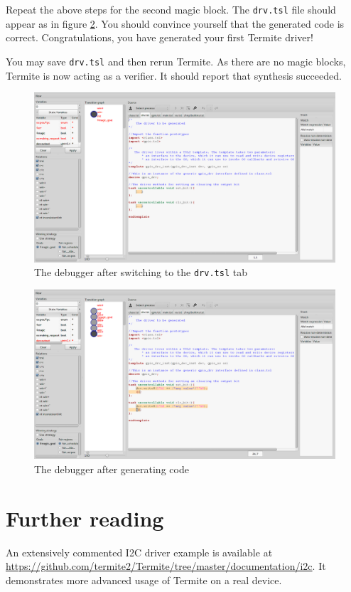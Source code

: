 \documentclass{article}
\newcommand{\code}[1]{\texttt{#1}}
\begin{document}
Repeat the above steps for the second magic block. The \code{drv.tsl} file should appear as in figure \ref{fig:screenshot_after}. You should convince yourself that the generated code is correct. Congratulations, you have generated your first Termite driver!

You may save \code{drv.tsl} and then rerun Termite. As there are no magic blocks, Termite is now acting as a verifier. It should report that synthesis succeeded. 

\begin{figure}
    \center
    \includegraphics[width=\linewidth]{figs/debugger1.png}
    \caption{The debugger after switching to the \code{drv.tsl} tab}
    \label{fig:screenshot_before}
\end{figure}

\begin{figure}
    \center
    \includegraphics[width=\linewidth]{figs/debugger2.png}
    \caption{The debugger after generating code}
    \label{fig:screenshot_after}
\end{figure}

\section{Further reading}
An extensively commented I2C driver example is available at \url{https://github.com/termite2/Termite/tree/master/documentation/i2c}. It demonstrates more advanced usage of Termite on a real device. 


 
\end{document}
